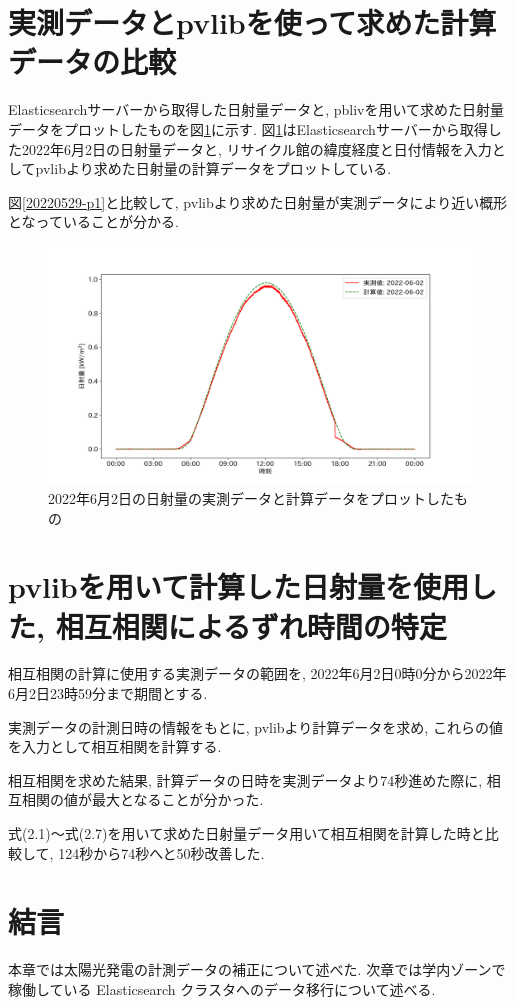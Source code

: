 \section{実測データとpvlibを使って求めた計算データの比較}
Elasticsearchサーバーから取得した日射量データと, pblivを用いて求めた日射量データをプロットしたものを図\ref{2-p1}に示す.
図\ref{2-p1}はElasticsearchサーバーから取得した2022年6月2日の日射量データと, リサイクル館の緯度経度と日付情報を入力としてpvlibより求めた日射量の計算データをプロットしている.

図\ref{20220529-p1}と比較して, pvlibより求めた日射量が実測データにより近い概形となっていることが分かる.

\begin{figure}[h]
  \begin{center}
    \includegraphics[width=160mm]{sotu/figure/2/pvlib-20220602-corr.png}
    \caption{2022年6月2日の日射量の実測データと計算データをプロットしたもの}
    \label{2-p1}
  \end{center}
\end{figure}

\section{pvlibを用いて計算した日射量を使用した, 相互相関によるずれ時間の特定}
相互相関の計算に使用する実測データの範囲を, 2022年6月2日0時0分から2022年6月2日23時59分まで期間とする.

実測データの計測日時の情報をもとに, pvlibより計算データを求め, これらの値を入力として相互相関を計算する.

相互相関を求めた結果, 計算データの日時を実測データより74秒進めた際に, 相互相関の値が最大となることが分かった.

式(2.1)～式(2.7)を用いて求めた日射量データ用いて相互相関を計算した時と比較して, 124秒から74秒へと50秒改善した.

\section{結言}
本章では太陽光発電の計測データの補正について述べた. 
次章では学内ゾーンで稼働している Elasticsearch クラスタへのデータ移行について述べる. 